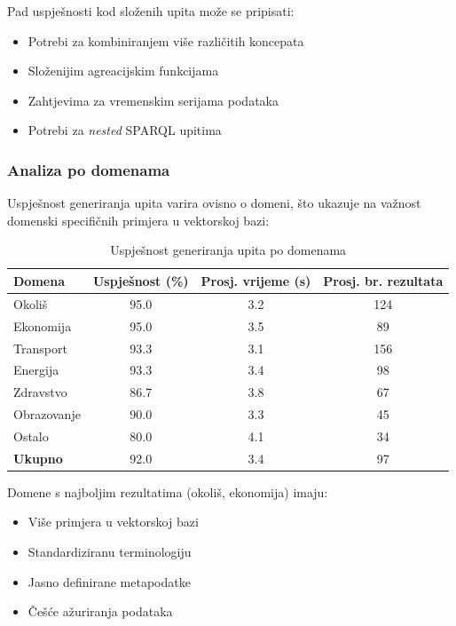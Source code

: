 Pad uspješnosti kod složenih upita može se pripisati:
\begin{itemize}
    \item Potrebi za kombiniranjem više različitih koncepata
    \item Složenijim agreacijskim funkcijama
    \item Zahtjevima za vremenskim serijama podataka
    \item Potrebi za \textit{nested} SPARQL upitima
\end{itemize}

\subsubsection{Analiza po domenama}

Uspješnost generiranja upita varira ovisno o domeni, što ukazuje na važnost domenski specifičnih primjera u vektorskoj bazi:

\begin{table}[htbp]
\centering
\caption{Uspješnost generiranja upita po domenama}
\label{tab:success_by_domain}
\begin{tabular}{|l|c|c|c|}
\hline
\textbf{Domena} & \textbf{Uspješnost (\%)} & \textbf{Prosj. vrijeme (s)} & \textbf{Prosj. br. rezultata} \\
\hline
Okoliš & 95.0 & 3.2 & 124 \\
Ekonomija & 95.0 & 3.5 & 89 \\
Transport & 93.3 & 3.1 & 156 \\
Energija & 93.3 & 3.4 & 98 \\
Zdravstvo & 86.7 & 3.8 & 67 \\
Obrazovanje & 90.0 & 3.3 & 45 \\
Ostalo & 80.0 & 4.1 & 34 \\
\hline
\textbf{Ukupno} & 92.0 & 3.4 & 97 \\
\hline
\end{tabular}
\end{table}

Domene s najboljim rezultatima (okoliš, ekonomija) imaju:
\begin{itemize}
    \item Više primjera u vektorskoj bazi
    \item Standardiziranu terminologiju
    \item Jasno definirane metapodatke
    \item Češće ažuriranja podataka
\end{itemize}

